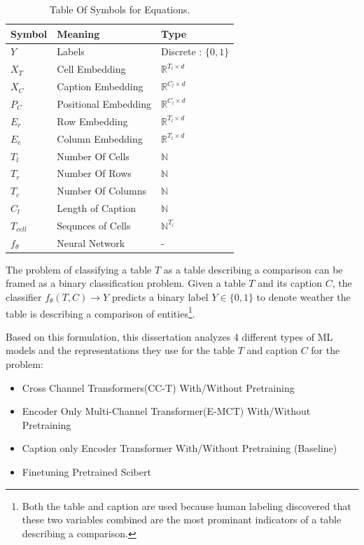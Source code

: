 \begin{table}
    \label{table\arabic{tablecounter}}
    \centering
    \begin{tabular}{|l|l|l|}
        \hline
        Symbol & Meaning & Type \\ \hline
        $Y$ & Labels & Discrete : $\{0,1\}$ \\ \hline
        $X_T$ & Cell Embedding & $\mathbb{R}^{T_l \times d}$\\ \hline
        $X_C$ & Caption Embedding & $\mathbb{R}^{C_l \times d}$ \\ \hline
        $P_C$ & Positional Embedding & $\mathbb{R}^{C_l \times d}$ \\ \hline
        $E_r$ & Row Embedding & $\mathbb{R}^{T_l \times d}$ \\ \hline
        $E_c$ & Column Embedding & $\mathbb{R}^{T_l \times d}$ \\ \hline
        $T_l$ & Number Of Cells & $\mathbb{N}$ \\ \hline
        $T_r$ & Number Of Rows & $\mathbb{N}$ \\ \hline
        $T_c$ & Number Of Columns & $\mathbb{N}$ \\ \hline
        $C_l$ & Length of Caption & $\mathbb{N}$ \\ \hline
        $T_{cell}$ & Sequnces of Cells & $\mathbb{N}^{T_l}$ \\ \hline
        $f_\theta$ & Neural Network & - \\ \hline
    \end{tabular}
    \caption{\label{tablecounter} Table Of Symbols for Equations. }
\end{table}
The problem of classifying a table $T$ as a table describing a comparison can be framed as a binary classification problem. Given a table $T$ and its caption $C$, the classifier $f_\theta(T,C) \rightarrow Y$ predicts a binary label $Y \in \{0,1\}$ to denote weather the table is describing a comparison of entities\footnote{Both the table and caption are used because human labeling discovered that these two variables combined are the most prominant indicators of a table describing a comparison.}. 

Based on this formulation, this dissertation analyzes 4 different types of ML models and the representations they use for the table $T$ and caption $C$ for the problem:
\begin{itemize}
    \item Cross Channel Transformers(CC-T) With/Without Pretraining
    \item Encoder Only Multi-Channel Transformer(E-MCT) With/Without Pretraining
    \item Caption only Encoder Transformer With/Without Pretraining (Baseline)
    \item Finetuning Pretrained Scibert
\end{itemize}

